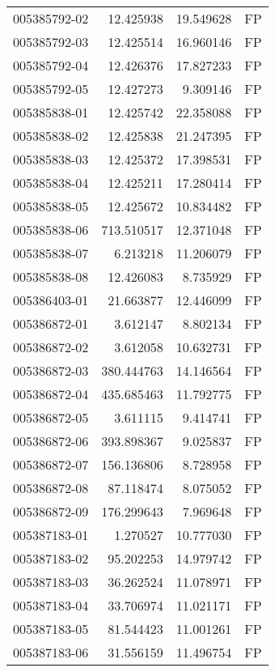 \begin{tabular}{lrrl}
005385792-02 &   12.425938 &      19.549628 &   FP \\
005385792-03 &   12.425514 &      16.960146 &   FP \\
005385792-04 &   12.426376 &      17.827233 &   FP \\
005385792-05 &   12.427273 &       9.309146 &   FP \\
005385838-01 &   12.425742 &      22.358088 &   FP \\
005385838-02 &   12.425838 &      21.247395 &   FP \\
005385838-03 &   12.425372 &      17.398531 &   FP \\
005385838-04 &   12.425211 &      17.280414 &   FP \\
005385838-05 &   12.425672 &      10.834482 &   FP \\
005385838-06 &  713.510517 &      12.371048 &   FP \\
005385838-07 &    6.213218 &      11.206079 &   FP \\
005385838-08 &   12.426083 &       8.735929 &   FP \\
005386403-01 &   21.663877 &      12.446099 &   FP \\
005386872-01 &    3.612147 &       8.802134 &   FP \\
005386872-02 &    3.612058 &      10.632731 &   FP \\
005386872-03 &  380.444763 &      14.146564 &   FP \\
005386872-04 &  435.685463 &      11.792775 &   FP \\
005386872-05 &    3.611115 &       9.414741 &   FP \\
005386872-06 &  393.898367 &       9.025837 &   FP \\
005386872-07 &  156.136806 &       8.728958 &   FP \\
005386872-08 &   87.118474 &       8.075052 &   FP \\
005386872-09 &  176.299643 &       7.969648 &   FP \\
005387183-01 &    1.270527 &      10.777030 &   FP \\
005387183-02 &   95.202253 &      14.979742 &   FP \\
005387183-03 &   36.262524 &      11.078971 &   FP \\
005387183-04 &   33.706974 &      11.021171 &   FP \\
005387183-05 &   81.544423 &      11.001261 &   FP \\
005387183-06 &   31.556159 &      11.496754 &   FP \\

\end{tabular}
